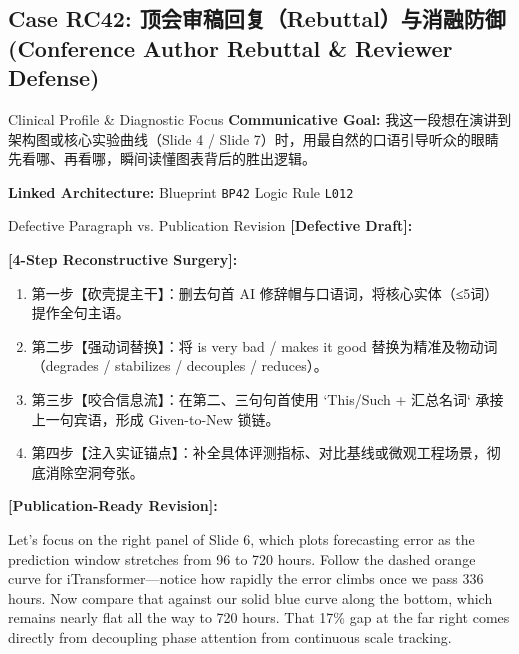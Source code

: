 \subsection{Case RC42: 顶会审稿回复（Rebuttal）与消融防御 (Conference Author Rebuttal \& Reviewer Defense)}\label{case:RC42}
\begin{ConceptBox}{Clinical Profile \& Diagnostic Focus}
\textbf{Communicative Goal:} 我这一段想在演讲到架构图或核心实验曲线（Slide 4 / Slide 7）时，用最自然的口语引导听众的眼睛先看哪、再看哪，瞬间读懂图表背后的胜出逻辑。\par
\textbf{Linked Architecture:} Blueprint \texttt{BP42} \enspace\textbar\enspace Logic Rule \texttt{L012}
\end{ConceptBox}
\begin{ExampleBox}{Defective Paragraph vs. Publication Revision}
\textbf{\color{TargetHighlight}[Defective Draft]:}\par
{}\par\vspace{6pt}
\textbf{\color{AcadForest}[4-Step Reconstructive Surgery]:}
\begin{enumerate}[label=\textbf{\color{AcadNavy}Step \arabic*:}, leftmargin=2em]
  \item 第一步【砍壳提主干】：删去句首 AI 修辞帽与口语词，将核心实体（≤5词）提作全句主语。
  \item 第二步【强动词替换】：将 is very bad / makes it good 替换为精准及物动词（degrades / stabilizes / decouples / reduces）。
  \item 第三步【咬合信息流】：在第二、三句句首使用 `This/Such + 汇总名词` 承接上一句宾语，形成 Given-to-New 锁链。
  \item 第四步【注入实证锚点】：补全具体评测指标、对比基线或微观工程场景，彻底消除空洞夸张。
\end{enumerate}\vspace{4pt}
\textbf{\color{AcadNavy}[Publication-Ready Revision]:}\par
Let's focus on the right panel of Slide 6, which plots forecasting error as the prediction window stretches from 96 to 720 hours. Follow the dashed orange curve for iTransformer---notice how rapidly the error climbs once we pass 336 hours. Now compare that against our solid blue curve along the bottom, which remains nearly flat all the way to 720 hours. That 17\% gap at the far right comes directly from decoupling phase attention from continuous scale tracking.
\end{ExampleBox}
